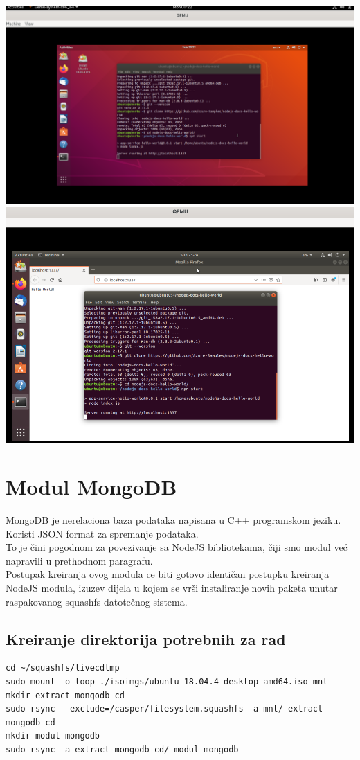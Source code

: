\documentclass[12pt,vi]{mitthesis}
\begin{document}
\includegraphics[width=\linewidth]{images/ModulNodeJSUbuntuTerminal.png}\\
\includegraphics[width=\linewidth]{images/ModulNodeJSUbuntu1.png} 
\newpage
\section*{Modul MongoDB}
MongoDB je nerelaciona baza podataka napisana u C++ programskom jeziku. Koristi JSON format za spremanje podataka.\\
To je čini pogodnom za povezivanje sa NodeJS bibliotekama, čiji smo modul već napravili u prethodnom paragrafu.\\
Postupak kreiranja ovog modula ce biti gotovo identičan postupku kreiranja NodeJS modula, izuzev dijela u kojem se vrši instaliranje novih paketa unutar raspakovanog squashfs datotečnog sistema.\\

\subsection*{Kreiranje direktorija potrebnih za rad}
\begin{lstlisting}[style=BashInputStyle]
cd ~/squashfs/livecdtmp
sudo mount -o loop ./isoimgs/ubuntu-18.04.4-desktop-amd64.iso mnt
mkdir extract-mongodb-cd
sudo rsync --exclude=/casper/filesystem.squashfs -a mnt/ extract-mongodb-cd
mkdir modul-mongodb
sudo rsync -a extract-mongodb-cd/ modul-mongodb
\end{lstlisting}
\end{document}
